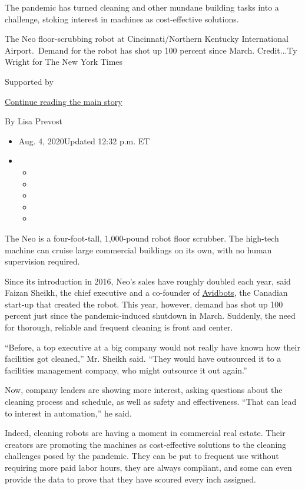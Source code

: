 The pandemic has turned cleaning and other mundane building tasks into a
challenge, stoking interest in machines as cost-effective solutions.

The Neo floor-scrubbing robot at Cincinnati/Northern Kentucky
International Airport.~Demand for the robot has shot up 100 percent
since March. Credit...Ty Wright for The New York Times

Supported by

\protect\hyperlink{after-sponsor}{Continue reading the main story}

By Lisa Prevost

\begin{itemize}
\item
  Aug. 4, 2020Updated 12:32 p.m. ET
\item
  \begin{itemize}
  \item
  \item
  \item
  \item
  \item
  \end{itemize}
\end{itemize}

The Neo is a four-foot-tall, 1,000-pound robot floor scrubber. The
high-tech machine can cruise large commercial buildings on its own, with
no human supervision required.

Since its introduction in 2016, Neo's sales have roughly doubled each
year, said Faizan Sheikh, the chief executive and a co-founder of
\href{https://www.avidbots.com/}{Avidbots}, the Canadian start-up that
created the robot. This year, however, demand has shot up 100 percent
just since the pandemic-induced shutdown in March. Suddenly, the need
for thorough, reliable and frequent cleaning is front and center.

``Before, a top executive at a big company would not really have known
how their facilities got cleaned,'' Mr. Sheikh said. ``They would have
outsourced it to a facilities management company, who might outsource it
out again.''

Now, company leaders are showing more interest, asking questions about
the cleaning process and schedule, as well as safety and effectiveness.
``That can lead to interest in automation,'' he said.

Indeed, cleaning robots are having a moment in commercial real estate.
Their creators are promoting the machines as cost-effective solutions to
the cleaning challenges posed by the pandemic. They can be put to
frequent use without requiring more paid labor hours, they are always
compliant, and some can even provide the data to prove that they have
scoured every inch assigned.

